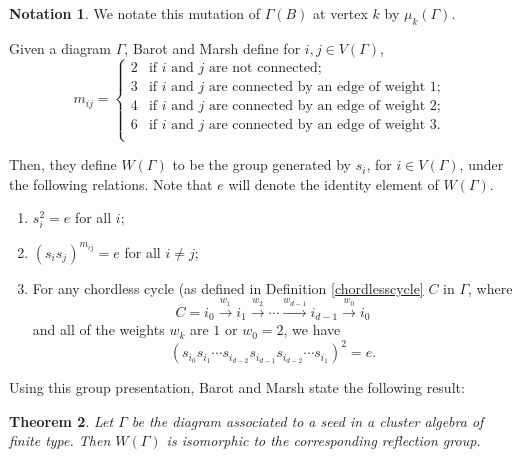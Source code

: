 \documentclass[11pt]{amsart}
\newtheorem{thm}{Theorem}[section]
\theoremstyle{definition}
\newtheorem{note}[thm]{Notation}
\newcommand\V{V(\Gamma)}
\begin{document}
\begin{note}
We notate this mutation of $\Gamma(B)$ at vertex $k$ by $\mu_k(\Gamma)$. \\
\end{note}


\indent Given a diagram $\Gamma$, Barot and Marsh define for $i, j \in \V$,
\begin{displaymath}
\label{mij_defn}
m_{ij} = \begin{cases} 2 & \mbox{if } i \mbox{ and } j \mbox{ are not connected;} \\
3 & \mbox{if } i \mbox{ and } j \mbox{ are connected by an edge of weight } 1;\\
4 & \mbox{if } i \mbox{ and } j \mbox{ are connected by an edge of weight } 2;\\
6 & \mbox{if } i \mbox{ and } j \mbox{ are connected by an edge of weight } 3.\\
\end{cases}
\end{displaymath}	

Then, they define $W(\Gamma)$ to be the group generated by $s_i$, for $i \in \V$, under the following relations. Note that $e$ will denote the identity element of $W(\Gamma)$.
\begin{enumerate}
\item $s_i^2 = e$ for all $i$;
\item $(s_is_j)^{m_{ij}} = e$ for all $i \neq j$;
\item For any chordless cycle (as defined in Definition \ref{chordlesscycle} $C$ in $\Gamma$, where
\begin{displaymath}
C = i_0 \xrightarrow{w_1} i_1 \xrightarrow{w_2} \cdots \xrightarrow{w_{d-1}} i_{d-1} \xrightarrow{w_0} i_0
\end{displaymath}
and all of the weights $w_k$ are $1$ or $w_0 = 2$, we have
\begin{displaymath}
(s_{i_0}s_{i_1}\cdots s_{i_{d-2}}s_{i_{d-1}}s_{i_{d-2}}\cdots s_{i_1})^2 =e.
\end{displaymath}
\end{enumerate}

Using this group presentation, Barot and Marsh state the following result:
\begin{thm}\cite[Theorem A]{BM13}
Let $\Gamma$ be the diagram associated to a seed in a cluster algebra of finite type. Then $W(\Gamma)$ is isomorphic to the corresponding reflection group.
\end{thm}
\end{document}
